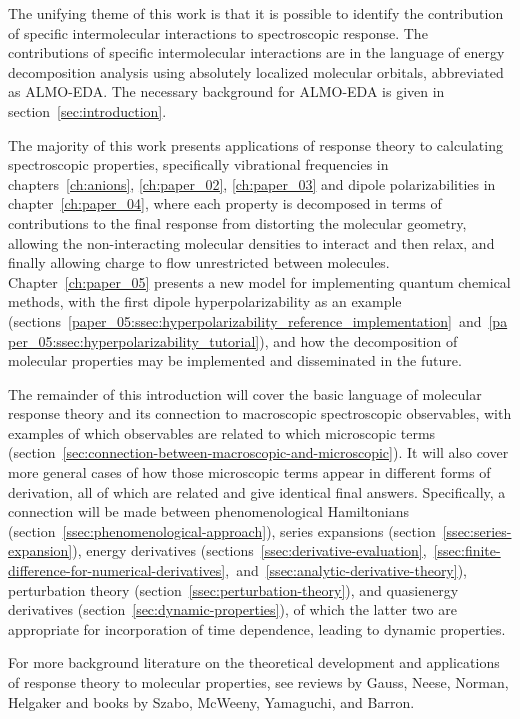 \documentclass[%
class = book,%
crop = false,%
float = true,%
multi = true,%
preview = false,%
]{standalone}
\let\cite\autocite
\begin{document}
The unifying theme of this work is that it is possible to identify the contribution of specific intermolecular interactions to spectroscopic response. The contributions of specific intermolecular interactions are in the language of energy decomposition analysis using absolutely localized molecular orbitals, abbreviated as ALMO-EDA. The necessary background for ALMO-EDA is given in section~\ref{sec:introduction}.

The majority of this work presents applications of response theory to calculating spectroscopic properties, specifically vibrational frequencies in chapters~\ref{ch:anions}, \ref{ch:paper_02}, \ref{ch:paper_03} and dipole polarizabilities in chapter~\ref{ch:paper_04}, where each property is decomposed in terms of contributions to the final response from distorting the molecular geometry, allowing the non-interacting molecular densities to interact and then relax, and finally allowing charge to flow unrestricted between molecules. Chapter~\ref{ch:paper_05} presents a new model for implementing quantum chemical methods, with the first dipole hyperpolarizability as an example (sections~\ref{paper_05:ssec:hyperpolarizability_reference_implementation}~and~\ref{paper_05:ssec:hyperpolarizability_tutorial}), and how the decomposition of molecular properties may be implemented and disseminated in the future.

The remainder of this introduction will cover the basic language of molecular response theory and its connection to macroscopic spectroscopic observables, with examples of which observables are related to which microscopic terms (section~\ref{sec:connection-between-macroscopic-and-microscopic}). It will also cover more general cases of how those microscopic terms appear in different forms of derivation, all of which are related and give identical final answers. Specifically, a connection will be made between phenomenological Hamiltonians (section~\ref{ssec:phenomenological-approach}), series expansions (section~\ref{ssec:series-expansion}), energy derivatives (sections~\ref{ssec:derivative-evaluation},~\ref{ssec:finite-difference-for-numerical-derivatives},~and~\ref{ssec:analytic-derivative-theory}), perturbation theory (section~\ref{ssec:perturbation-theory}), and quasienergy derivatives (section~\ref{sec:dynamic-properties}), of which the latter two are appropriate for incorporation of time dependence, leading to dynamic properties.

For more background literature on the theoretical development and applications of response theory to molecular properties, see reviews by Gauss\cite{gauss2000}, Neese\cite{NEESE2009526}, Norman\cite{C1CP21951K}, Helgaker\cite{doi:10.1021/cr2002239} and books by Szabo\cite{szabo1989modern}, McWeeny\cite{mcweeny1989methods}, Yamaguchi\cite{Yamaguchi1994}, and Barron\cite{barron2004molecular}.
\end{document}
